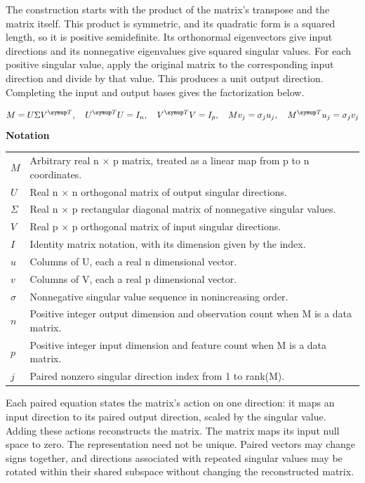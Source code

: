 \documentclass[10pt,letterpaper]{article}
\newcommand{\notlabel}{\noindent\textbf{Notation}\par\nobreak\vspace{4pt}}
\begin{document}
The construction starts with the product of the matrix's transpose and the matrix itself. This product is symmetric, and its quadratic form is a squared length, so it is positive semidefinite. Its orthonormal eigenvectors give input directions and its nonnegative eigenvalues give squared singular values. For each positive singular value, apply the original matrix to the corresponding input direction and divide by that value. This produces a unit output direction. Completing the input and output bases gives the factorization below.\par

\par\noindent\begin{minipage}{\linewidth}
\begin{equation}\label{eq:svd}
M=U\Sigma V^{\symup T},\quad U^{\symup T}U=I_n,\quad V^{\symup T}V=I_p,\quad Mv_j=\sigma_j u_j,\quad M^{\symup T}u_j=\sigma_j v_j
\end{equation}
\notlabel
{\fontsize{8.5}{10.5}\selectfont\setlength{\tabcolsep}{0pt}\renewcommand{\arraystretch}{1.12}
\begin{tabularx}{\linewidth}{@{}p{.14\linewidth}X@{}}
$M$ & Arbitrary real n \ensuremath{\times} p matrix, treated as a linear map from p to n coordinates.\\
$U$ & Real n \ensuremath{\times} n orthogonal matrix of output singular directions.\\
$\Sigma$ & Real n \ensuremath{\times} p rectangular diagonal matrix of nonnegative singular values.\\
$V$ & Real p \ensuremath{\times} p orthogonal matrix of input singular directions.\\
$I$ & Identity matrix notation, with its dimension given by the index.\\
$u$ & Columns of U, each a real n dimensional vector.\\
$v$ & Columns of V, each a real p dimensional vector.\\
$\sigma$ & Nonnegative singular value sequence in nonincreasing order.\\
$n$ & Positive integer output dimension and observation count when M is a data matrix.\\
$p$ & Positive integer input dimension and feature count when M is a data matrix.\\
$j$ & Paired nonzero singular direction index from 1 to rank(M).\\
\end{tabularx}}
\par\vspace{2pt}
\end{minipage}\par
Each paired equation states the matrix's action on one direction: it maps an input direction to its paired output direction, scaled by the singular value. Adding these actions reconstructs the matrix. The matrix maps its input null space to zero. The representation need not be unique. Paired vectors may change signs together, and directions associated with repeated singular values may be rotated within their shared subspace without changing the reconstructed matrix.\par
\end{document}
